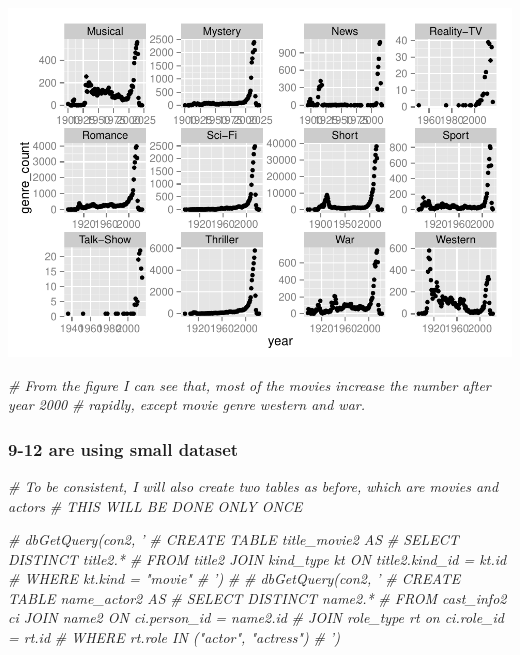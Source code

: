 \documentclass[]{article}
\newenvironment{Shaded}{\begin{snugshade}}{\end{snugshade}}
\newcommand{\CommentTok}[1]{\textcolor[rgb]{0.56,0.35,0.01}{\textit{{#1}}}}
\begin{document}
\includegraphics{test2_files/figure-latex/unnamed-chunk-2-2.pdf}

\begin{Shaded}
\begin{Highlighting}[]
\CommentTok{# From the figure I can see that, most of the movies increase the number after year 2000}
\CommentTok{# rapidly, except movie genre western and war.}
\end{Highlighting}
\end{Shaded}

\subsubsection{9-12 are using small dataset}\label{are-using-small-dataset}

\begin{Shaded}
\begin{Highlighting}[]
\CommentTok{# To be consistent, I will also create two tables as before, which are movies and actors}
\CommentTok{# THIS WILL BE DONE ONLY ONCE}

\CommentTok{# dbGetQuery(con2, '}
\CommentTok{#            CREATE TABLE title_movie2 AS}
\CommentTok{#            SELECT DISTINCT title2.*}
\CommentTok{#            FROM title2 JOIN kind_type kt ON title2.kind_id = kt.id}
\CommentTok{#            WHERE kt.kind = "movie"}
\CommentTok{#            ')}
\CommentTok{# }
\CommentTok{# dbGetQuery(con2, '}
\CommentTok{#            CREATE TABLE name_actor2 AS}
\CommentTok{#            SELECT DISTINCT name2.*}
\CommentTok{#            FROM cast_info2 ci JOIN name2 ON ci.person_id = name2.id}
\CommentTok{#            JOIN role_type rt on ci.role_id = rt.id}
\CommentTok{#            WHERE rt.role IN ("actor", "actress")}
\CommentTok{#            ')}
\end{Highlighting}
\end{Shaded}
\end{document}

